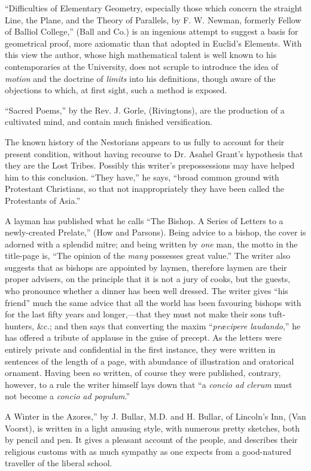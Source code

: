 ``Difficulties of Elementary Geometry, especially
those which concern the straight Line, the Plane, and the Theory of
Parallels, by F. W. Newman, formerly Fellow of Balliol College,'' (Ball
and Co.) is an ingenious attempt to suggest a basis for geometrical
proof, more axiomatic than that adopted in Euclid's Elements. With this
view the author, whose high mathematical talent is well known to his
contemporaries at the University, does not scruple to introduce the idea
of \emph{motion} and the doctrine of \emph{limits} into his definitions,
though aware of the objections to which, at first sight, such a method
is exposed.

``Sacred Poems,'' by the Rev. J. Gorle, (Rivingtons),
are the production of a cultivated mind, and contain much finished
versification.

The known history of the Nestorians appears to us
fully to account for their present condition, without having recourse to
Dr. Asahel Grant's hypothesis that they are the Lost Tribes. Possibly
this writer's prepossessions may have helped him to this conclusion. ``They
have,'' he says, ``broad common ground with Protestant Christians, so that
not inappropriately they have been called the Protestants of Asia.''

A layman has published what he calls ``The Bishop. A
Series of Letters to a newly-created Prelate,'' (How and Parsons). Being
advice to a bishop, the cover is adorned with a splendid mitre; and
being written by \emph{one} man, the motto in the title-page is, ``The
opinion of the \emph{many} possesses great value.'' The writer also
suggests that as bishops are appointed by laymen, therefore laymen are
their proper advisers, on the principle that it is not a jury of cooks,
but the guests, who pronounce whether a dinner has been well dressed.
The writer gives ``his friend'' much the same advice that all the world
has been favouring bishops with for the last fifty years and
longer,—that they must not make their sons tuft-hunters, \&c.; and
then says that converting the maxim ``\emph{præcipere laudando},'' he has
offered a tribute of applause in the guise of precept. As the letters
were entirely private and confidential in the first instance, they were
written in sentences of the length of a page, with abundance of
illustration and oratorical ornament. Having been so written, of course
they were published, contrary, however, to a rule the writer himself
lays down that ``a \emph{concio ad clerum} must not become a \emph{concio ad
populum}.''

A Winter in the Azores,'' by J. Bullar, M.D. and H.
Bullar, of Lincoln's Inn, (Van Voorst), is written in a light amusing
style, with numerous pretty sketches, both by pencil and pen. It gives a
pleasant account of the people, and describes their religious customs
with as much sympathy as one expects from a good-natured traveller of
the liberal school.

